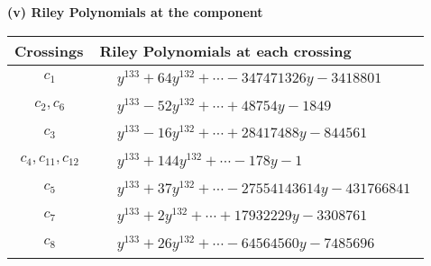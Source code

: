 \documentclass[1p]{elsarticle_modified}
\theoremstyle{definition}
\begin{document}
\newpage\renewcommand{\arraystretch}{1}
\flushleft \textbf{(v) Riley Polynomials at the component}\newline \\
\begin{tabular}{m{50pt}|m{274pt}}
Crossings & \hspace{64pt}Riley Polynomials at each crossing \\
\hline $$\begin{aligned}c_{1}\end{aligned}$$&$\begin{aligned}
&y^{133}+64 y^{132}+\cdots-347471326 y-3418801
\end{aligned}$\\
\hline $$\begin{aligned}c_{2},c_{6}\end{aligned}$$&$\begin{aligned}
&y^{133}-52 y^{132}+\cdots+48754 y-1849
\end{aligned}$\\
\hline $$\begin{aligned}c_{3}\end{aligned}$$&$\begin{aligned}
&y^{133}-16 y^{132}+\cdots+28417488 y-844561
\end{aligned}$\\
\hline $$\begin{aligned}c_{4},c_{11},c_{12}\end{aligned}$$&$\begin{aligned}
&y^{133}+144 y^{132}+\cdots-178 y-1
\end{aligned}$\\
\hline $$\begin{aligned}c_{5}\end{aligned}$$&$\begin{aligned}
&y^{133}+37 y^{132}+\cdots-27554143614 y-431766841
\end{aligned}$\\
\hline $$\begin{aligned}c_{7}\end{aligned}$$&$\begin{aligned}
&y^{133}+2 y^{132}+\cdots+17932229 y-3308761
\end{aligned}$\\
\hline $$\begin{aligned}c_{8}\end{aligned}$$&$\begin{aligned}
&y^{133}+26 y^{132}+\cdots-64564560 y-7485696
\end{aligned}$\\

\end{tabular}
\end{document}
